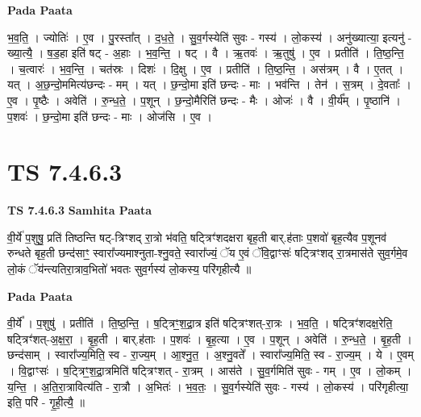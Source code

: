 \documentclass[17pt]{extarticle}
\begin{document}
\textbf{Pada Paata} \newline

भ॒व॒ति॒ । ज्योतिः॑ । ए॒व । पु॒रस्ता᳚त् । द॒ध॒ते॒ । सु॒व॒र्गस्येति॑ सुवः - गस्य॑ । लो॒कस्य॑ । अनु॑ख्यात्या॒ इत्यनु॑ - ख्या॒त्यै॒ । ष॒ड॒हा इति॑ षट् - अ॒हाः । भ॒व॒न्ति॒ । षट् । वै । ऋ॒तवः॑ । ऋ॒तुषु॑ । ए॒व । प्रतीति॑ । ति॒ष्ठ॒न्ति॒ । च॒त्वारः॑ । भ॒व॒न्ति॒ । चत॑स्रः । दिशः॑ । दि॒क्षु । ए॒व । प्रतीति॑ । ति॒ष्ठ॒न्ति॒ । अस॑त्रम् । वै । ए॒तत् । यत् । अ॒छ॒न्दो॒ममित्य॑छन्दः - मम् । यत् । छ॒न्दो॒मा इति॑ छन्दः - माः । भव॑न्ति । तेन॑ । स॒त्रम् । दे॒वताः᳚ । ए॒व । पृ॒ष्ठैः । अवेति॑ । रु॒न्ध॒ते॒ । प॒शून् । छ॒न्दो॒मैरिति॑ छन्दः - मैः । ओजः॑ । वै । वी॒र्य᳚म् । पृ॒ष्ठानि॑ । प॒शवः॑ । छ॒न्दो॒मा इति॑ छन्दः - माः । ओज॑सि । ए॒व ।  \newline





\section{ TS 7.4.6.3 }

\textbf{TS 7.4.6.3 } \newline
\textbf{Samhita Paata} \newline

वी॒र्ये॑ प॒शुषु॒ प्रति॑ तिष्ठन्ति षट्-त्रिꣳशद् रा॒त्रो भ॑वति॒ षट्त्रिꣳ॑शदक्षरा बृह॒ती बार्.ह॑ताः प॒शवो॑ बृह॒त्यैव प॒शूनव॑ रुन्धते बृह॒ती छन्द॑साꣳ॒॒ स्वारा᳚ज्यमाश्नुता-श्नु॒वते॒ स्वारा᳚ज्यं॒ ॅय ए॒वं ॅवि॒द्वाꣳसः॑ षट्त्रिꣳशद् रा॒त्रमास॑ते सुव॒र्गमे॒व लो॒कं ॅय॑न्त्यतिरा॒त्राव॒भितो॑ भवतः सुव॒र्गस्य॑ लो॒कस्य॒ परि॑गृहीत्यै ॥ \newline

\textbf{Pada Paata} \newline

वी॒र्ये᳚ । प॒शुषु॑ । प्रतीति॑ । ति॒ष्ठ॒न्ति॒ । ष॒ट्त्रिꣳ॒॒श॒द्रा॒त्र इति॑ षट्त्रिꣳशत्-रा॒त्रः । भ॒व॒ति॒ । षट्त्रिꣳ॑शदक्ष॒रेति॒ षट्त्रिꣳ॑शत्-अ॒क्ष॒रा॒ । बृ॒ह॒ती । बार्.ह॑ताः । प॒शवः॑ । बृ॒ह॒त्या । ए॒व । प॒शून् । अवेति॑ । रु॒न्ध॒ते॒ । बृ॒ह॒ती । छन्द॑साम् । स्वारा᳚ज्य॒मिति॒ स्व - रा॒ज्य॒म् । आ॒श्नु॒त॒ । अ॒श्नु॒वते᳚ । स्वारा᳚ज्य॒मिति॒ स्व - रा॒ज्य॒म् । ये । ए॒वम् । वि॒द्वाꣳसः॑ । ष॒ट्त्रिꣳ॒॒श॒द्रा॒त्रमिति॑ षट्त्रिꣳशत् - रा॒त्रम् । आस॑ते । सु॒व॒र्गमिति॑ सुवः - गम् । ए॒व । लो॒कम् । य॒न्ति॒ । अ॒ति॒रा॒त्रावित्य॑ति - रा॒त्रौ । अ॒भितः॑ । भ॒व॒तः॒ । सु॒व॒र्गस्येति॑ सुवः - गस्य॑ । लो॒कस्य॑ । परि॑गृहीत्या॒ इति॒ परि॑ - गृ॒ही॒त्यै॒ ॥  \newline
\end{document}
